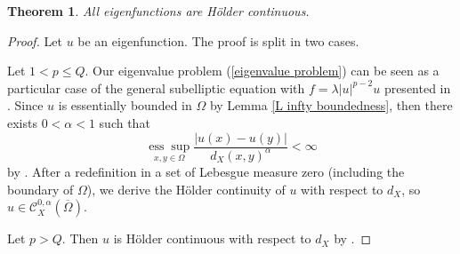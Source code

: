 \documentclass[a4paper,12pt,reqno]{amsart}
\renewcommand\eqref[1]{(\ref{#1})} %
\numberwithin{equation}{section}
\theoremstyle{plain}
\newtheorem{theorem}{Theorem}[section]
\theoremstyle{definition}
\begin{document}
\begin{theorem}\label{Holder continuity}
All eigenfunctions  are H\"older continuous.
\end{theorem}
\begin{proof}
Let $u$ be an eigenfunction. The proof is split in two cases.

Let $1<p\leq Q$. Our eigenvalue problem \eqref{eigenvalue problem} can be seen as a particular case of the general subelliptic equation with $f=\lambda|u|^{p-2} u $ presented in \cite[p. 1767]{capogna1993embedding}. Since $u$ is essentially bounded in $\Omega$ by Lemma \ref{L infty boundedness}, then there exists $0<\alpha<1$ such that
$$
\underset{x, y \in \Omega}{\operatorname{ess} \sup } \frac{|u(x)-u(y)|}{d_{X}(x,y)^\alpha} < \infty
$$
by \cite[Theorem 3.35]{capogna1993embedding}. After a redefinition in a set of Lebesgue measure zero (including the boundary of $\Omega$), we derive the H\"older continuity of $u$ with respect to  $d_{X}$, so $u\in \mathcal{C}^{0,\alpha}_{X}(\overline{\Omega})$.



Let $p>Q$. Then $u$ is H\"older continuous with respect to  $d_{X}$  by \cite[Remark 1.1]{chen2024sharp}.
\end{proof}
\end{document}
